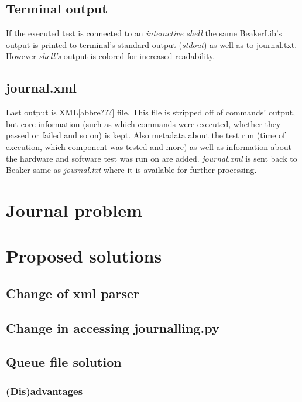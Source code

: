 \subsection{Terminal output}
If the executed test is connected to an \textit{interactive shell} the same BeakerLib's output is printed to terminal's standard output (\textit{stdout}) as well as to journal.txt. However \textit{shell's} output is colored for increased readability.  

\subsection{journal.xml}
Last output is XML[abbre???] file. This file is stripped off of commands' output, but core information (such as which commands were executed, whether they passed or failed and so on) is kept. Also metadata about the test run (time of execution, which component was tested and more) as well as information about the hardware and software test was run on are added. \textit{journal.xml} is sent back to Beaker same as \textit{journal.txt} where it is available for further processing.

\section{Journal problem}

\section{Proposed solutions}

\subsection{Change of xml parser}

\subsection{Change in accessing journalling.py}

\subsection{Queue file solution}

\subsubsection{(Dis)advantages}


